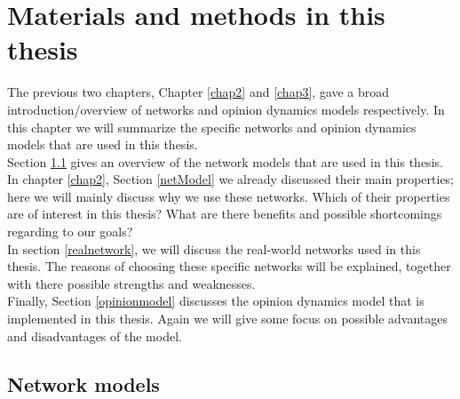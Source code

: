 \documentclass[11 pt , letterpaper , twoside , openright]{book}
\begin{document}



\chapter{Materials and methods in this thesis}\label{chap4}

The previous two chapters, Chapter \ref{chap2} and \ref{chap3}, gave a broad introduction/overview of networks and opinion dynamics models respectively. In this chapter we will summarize the specific networks and opinion dynamics models that are used in this thesis. \\
Section \ref{networkmodel} gives an overview of the network models that are used in this thesis. In chapter \ref{chap2}, Section \ref{netModel} we already discussed their main properties; here we will mainly discuss why we use these networks. Which of their properties are of interest in this thesis? What are there benefits and possible shortcomings regarding to our goals?\\
In section \ref{realnetwork}, we will discuss the real-world networks used in this thesis. The reasons of choosing these specific networks will be explained, together with there possible strengths and weaknesses.\\ %
Finally, Section \ref{opinionmodel} discusses the opinion dynamics model that is implemented in this thesis. Again we will give some focus on possible advantages and disadvantages of the model.


\section{Network models}\label{networkmodel}
\end{document}
